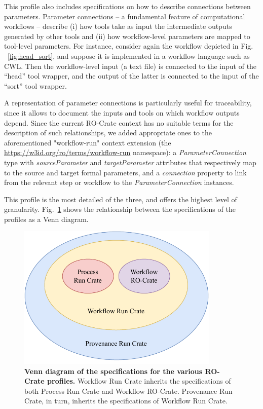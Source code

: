 \documentclass[10pt,letterpaper]{article}
\begin{document}
This profile also includes specifications on how to describe connections between parameters.
Parameter connections -- a fundamental feature of computational workflows -- describe (i) how tools take as input the intermediate outputs generated by other tools and (ii) how workflow-level parameters are mapped to tool-level parameters.
For instance, consider again the workflow depicted in Fig. ~\ref{fig:head_sort},
and suppose it is implemented in a workflow language such as CWL. Then the workflow-level input (a text file) is connected to the input of the “head” tool wrapper, and the output of the latter is connected to the input of the “sort” tool wrapper.


A representation of parameter connections is particularly useful for traceability, since it allows to document the inputs and tools on which workflow outputs depend.
Since the current RO-Crate context has no suitable terms for the description of such relationships, 
we added appropriate ones to the aforementioned  "workflow-run" context extension (the \url{https://w3id.org/ro/terms/workflow-run} namespace):
a \emph{ParameterConnection} type with
\emph{sourceParameter} and \emph{targetParameter} attributes that respectively map to the source and target formal parameters, and a
\emph{connection} property to link from the relevant step or workflow to the \emph{ParameterConnection} instances.

This profile is the most detailed of the three, and offers the highest level of granularity. Fig.~\ref{fig:profile_venn} shows the relationship between the specifications of the profiles as a Venn diagram.

\begin{figure}[!h]
  \includegraphics[width=26em]{wrroc-venn.drawio.pdf}
  \caption{{\bf Venn diagram of the specifications for the various RO-Crate profiles.}
  Workflow Run Crate inherits the specifications of both Process Run Crate and Workflow RO-Crate. Provenance Run Crate, in turn, inherits the specifications of Workflow Run Crate.}
  \label{fig:profile_venn}
  \end{figure}
\end{document}
